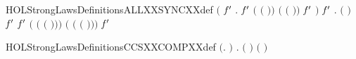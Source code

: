 \newcommand{\HOLStrongLawsDate}{19 Novembre 2019}
\newcommand{\HOLStrongLawsTime}{10:23}
\begin{SaveVerbatim}{HOLStrongLawsDefinitionsALLXXSYNCXXdef}
\HOLTokenTurnstile{} \ensuremath{(}\HOLSymConst{\HOLTokenForall{}} \ensuremath{\HOLBoundVar{f}\sp{\prime}} .
           \ensuremath{\HOLBoundVar{f}\sp{\prime}}  \HOLSymConst{\ensuremath{=}}
         \ensuremath{(} \ensuremath{(} \ensuremath{)}\ensuremath{)} \ensuremath{(} \ensuremath{(} \ensuremath{)}\ensuremath{)} \ensuremath{\HOLBoundVar{f}\sp{\prime}} \ensuremath{)} \HOLSymConst{\HOLTokenConj{}}
   \HOLSymConst{\HOLTokenForall{}}  \ensuremath{\HOLBoundVar{f}\sp{\prime}} .
         \ensuremath{(} \ensuremath{)} \ensuremath{\HOLBoundVar{f}\sp{\prime}}  \HOLSymConst{\ensuremath{=}}
          \ensuremath{\HOLBoundVar{f}\sp{\prime}}  \HOLSymConst{\ensuremath{+}}
        \ensuremath{(} \ensuremath{(} \ensuremath{(} \ensuremath{)}\ensuremath{)}\ensuremath{)} \ensuremath{(} \ensuremath{(} \ensuremath{(} \ensuremath{)}\ensuremath{)}\ensuremath{)} \ensuremath{\HOLBoundVar{f}\sp{\prime}} 
\end{SaveVerbatim}
\newcommand{\HOLStrongLawsDefinitionsALLXXSYNCXXdef}{\UseVerbatim{HOLStrongLawsDefinitionsALLXXSYNCXXdef}}
\begin{SaveVerbatim}{HOLStrongLawsDefinitionsCCSXXCOMPXXdef}
\HOLTokenTurnstile{} \ensuremath{(}\HOLSymConst{\HOLTokenForall{}}.    \HOLSymConst{\ensuremath{=}}  \ensuremath{)} \HOLSymConst{\HOLTokenConj{}} \HOLSymConst{\HOLTokenForall{}} .   \ensuremath{(} \ensuremath{)} \HOLSymConst{\ensuremath{=}}    \HOLSymConst{\ensuremath{\mid}}  \ensuremath{(} \ensuremath{)}
\end{SaveVerbatim}
\newcommand{\HOLStrongLawsDefinitionsCCSXXCOMPXXdef}{\UseVerbatim{HOLStrongLawsDefinitionsCCSXXCOMPXXdef}}
